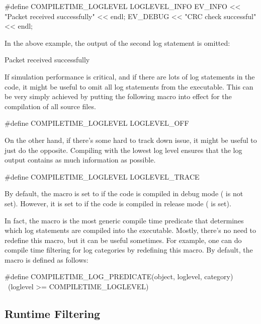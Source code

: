 \begin{cpp}
#define COMPILETIME_LOGLEVEL LOGLEVEL_INFO
EV_INFO << "Packet received successfully" << endl;
EV_DEBUG << "CRC check successful" << endl;
\end{cpp}

In the above example, the output of the second log statement is omitted:

\begin{filelisting}
[INFO] Packet received successfully
\end{filelisting}

If simulation performance is critical, and if there are lots of log statements
in the code, it might be useful to omit all log statements from the executable.
This can be very simply achieved by putting the following macro into effect for
the compilation of all source files.

\begin{cpp}
#define COMPILETIME_LOGLEVEL LOGLEVEL_OFF
\end{cpp}

On the other hand, if there's some hard to track down issue, it might be useful
to just do the opposite. Compiling with the lowest log level ensures that the
log output contains as much information as possible.

\begin{cpp}
#define COMPILETIME_LOGLEVEL LOGLEVEL_TRACE
\end{cpp}

By default, the  macro is set to
 if the code is compiled in debug mode ( is
not set). However, it is set to  if the code is compiled
in release mode ( is set).

In fact, the  macro is the most generic compile
time predicate that determines which log statements are compiled into the executable.
Mostly, there's no need to redefine this macro, but it can be useful sometimes.
For example, one can do compile time filtering for log categories by redefining
this macro. By default, the  macro is defined
as follows:

\begin{cpp}
#define COMPILETIME_LOG_PREDICATE(object, loglevel, category) \
        (loglevel >= COMPILETIME_LOGLEVEL)
\end{cpp}

\subsection{Runtime Filtering}
\label{sec:config-sim:runtime-log-filtering}

